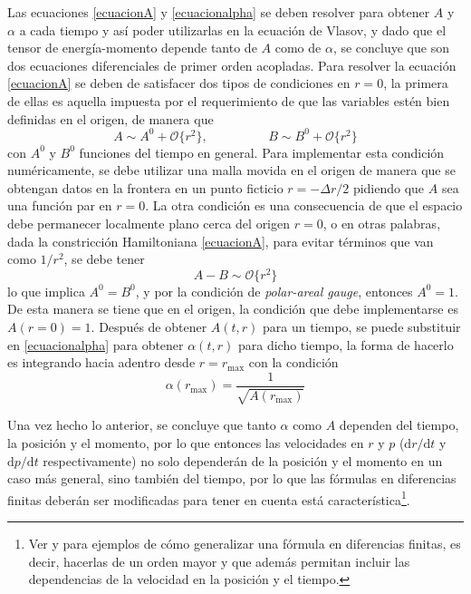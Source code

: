 \documentclass[11pt,twoside,openright,spanish]{report}
\numberwithin{equation}{chapter}
\numberwithin{figure}{chapter}
\numberwithin{table}{chapter}
\begin{document}
Las ecuaciones \eqref{ecuacionA} y \eqref{ecuacionalpha} se deben resolver para obtener $A$ y $\alpha$ a cada tiempo y así poder utilizarlas en la ecuación de Vlasov, y dado que el tensor de energía-momento depende tanto de $A$ como de $\alpha$, se concluye que son dos ecuaciones diferenciales de primer orden acopladas. Para resolver la ecuación \eqref{ecuacionA} se deben de satisfacer dos tipos de condiciones en $r=0$, la primera de ellas es aquella impuesta por el requerimiento de que las variables estén bien definidas en el origen, de manera que 
\begin{equation}
A\sim A^0+\mathcal{O}\{r^2\}, \hspace{2cm}B\sim B^0+\mathcal{O}\{r^2\}
\end{equation}
con $A^0$ y $B^0$ funciones del tiempo en general. Para implementar esta condición numéricamente, se debe utilizar una malla movida en el origen de manera que se obtengan datos en la frontera en un punto ficticio $r=-\Delta r/2$ pidiendo que $A$ sea una función par en $r=0$. La otra condición es una consecuencia de que el espacio debe permanecer localmente plano cerca del origen $r=0$, o en otras palabras, dada la constricción Hamiltoniana \eqref{ecuacionA}, para evitar términos que van como $1/r^2$, se debe tener
\begin{equation}
A-B\sim\mathcal{O}\{r^2\}
\end{equation}
lo que implica $A^0=B^0$, y por la condición de \textit{polar-areal gauge}, entonces $A^0=1$. De esta manera se tiene que en el origen, la condición que debe implementarse es $A(r=0)=1$. Después de obtener $A(t,r)$ para un tiempo, se puede substituir en \eqref{ecuacionalpha} para obtener $\alpha(t,r)$ para dicho tiempo, la forma de hacerlo es integrando hacia adentro desde $r=r_{\text{max}}$ con la condición 
\begin{equation}
\alpha(r_{\text{max}})=\frac{1}{\sqrt{A(r_{\text{max}})}}
\end{equation}

Una vez hecho lo anterior, se concluye que tanto $\alpha$ como $A$ dependen del tiempo, la posición y el momento, por lo que entonces las velocidades en $r$ y $p$ ($\text{d}r/\text{d}t$ y $\text{d}p/\text{d}t$ respectivamente) no solo dependerán de la posición y el momento en un caso más general, sino también del tiempo, por lo que las fórmulas en diferencias finitas deberán ser modificadas para tener en cuenta está característica\footnote{Ver \citet{schullenfdmfaivvf} y \citet{Thomas1998} para ejemplos de cómo generalizar una fórmula en diferencias finitas, es decir, hacerlas de un orden mayor y que además permitan incluir las dependencias de la velocidad en la posición y el tiempo.}.
\end{document}
